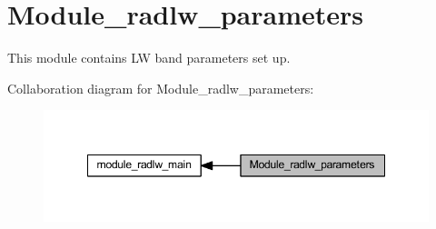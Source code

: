 \hypertarget{group__module__radlw__parameters}{}\section{Module\+\_\+radlw\+\_\+parameters}
\label{group__module__radlw__parameters}


This module contains LW band parameters set up.  


Collaboration diagram for Module\+\_\+radlw\+\_\+parameters\+:\nopagebreak
\begin{figure}[H]
\begin{center}
\leavevmode
\includegraphics[width=348pt]{group__module__radlw__parameters}
\end{center}
\end{figure}
